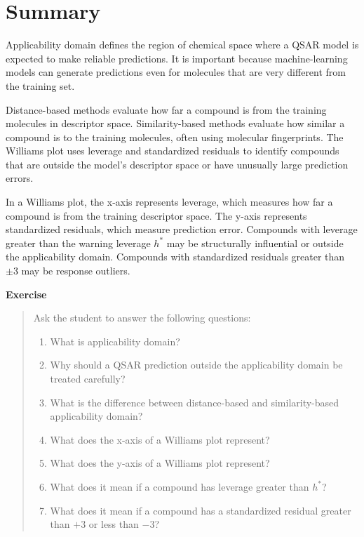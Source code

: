 \documentclass[11pt]{report}
\newenvironment{Important note}{\begin{quote}\color{red}\textbf{Important note:} }{\end{quote}}
\newenvironment{exercise}
{\vspace{0.5em}\noindent\textbf{Exercise}\begin{quote}}
{\end{quote}\vspace{0.5em}}
\begin{document}
\section{Summary}

Applicability domain defines the region of chemical space where a QSAR model is expected to make reliable predictions. It is important because machine-learning models can generate predictions even for molecules that are very different from the training set.

Distance-based methods evaluate how far a compound is from the training molecules in descriptor space. Similarity-based methods evaluate how similar a compound is to the training molecules, often using molecular fingerprints. The Williams plot uses leverage and standardized residuals to identify compounds that are outside the model's descriptor space or have unusually large prediction errors.

In a Williams plot, the x-axis represents leverage, which measures how far a compound is from the training descriptor space. The y-axis represents standardized residuals, which measure prediction error. Compounds with leverage greater than the warning leverage $h^*$ may be structurally influential or outside the applicability domain. Compounds with standardized residuals greater than $\pm 3$ may be response outliers.

\begin{exercise}
Ask the student to answer the following questions:

\begin{enumerate}[leftmargin=*]
    \item What is applicability domain?
    \item Why should a QSAR prediction outside the applicability domain be treated carefully?
    \item What is the difference between distance-based and similarity-based applicability domain?
    \item What does the x-axis of a Williams plot represent?
    \item What does the y-axis of a Williams plot represent?
    \item What does it mean if a compound has leverage greater than $h^*$?
    \item What does it mean if a compound has a standardized residual greater than $+3$ or less than $-3$?
\end{enumerate}
\end{exercise}
\end{document}
